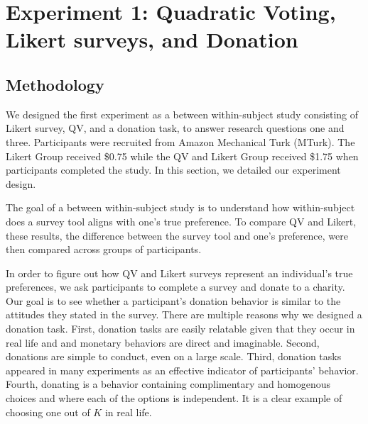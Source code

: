 \section{Experiment 1: Quadratic Voting, Likert surveys, and Donation}
\subsection{Methodology} \label{method-1}
We designed the first experiment as a between within-subject study
consisting of Likert survey, QV, and a donation task,
to answer research questions one and three. 
Participants were recruited from Amazon Mechanical Turk (MTurk).
The Likert Group received \$0.75 
while the QV and Likert Group received \$1.75 
when participants completed the study.
In this section, 
we detailed our experiment design.

The goal of a between within-subject study is to
understand how within-subject does a survey tool
aligns with one's true preference.
To compare QV and Likert, 
these results, 
the difference between the survey tool and one's preference, 
were then compared across groups of participants.

In order to figure out 
how QV and Likert surveys 
represent an individual's true preferences,
we ask participants to complete a survey
and donate to a charity.
Our goal is to see 
whether a participant's donation behavior is similar to 
the attitudes they stated in the survey.
There are multiple reasons
why we designed a donation task.
First, donation tasks are easily relatable
given that they occur in real life and
and monetary behaviors are direct and imaginable.
Second, donations are simple to conduct,
even on a large scale.
Third, donation tasks appeared in many experiments 
\cite{Xiao2019, benz2008people, gendall2010effect} 
as an effective indicator of participants' behavior.
Fourth, donating is a behavior containing
complimentary and homogenous choices and
where each of the options is independent.
It is a clear example of choosing one out of $K$ in real life.

